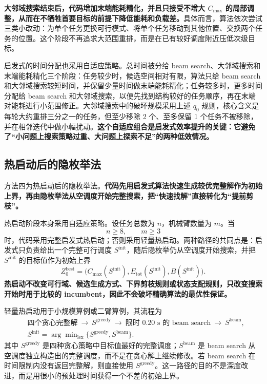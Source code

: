 \textbf{大邻域搜索结束后，代码增加末端能耗精化，并且只接受不增大 $C_{\max}$ 的局部调整，从而在不牺牲首要目标的前提下降低能耗和负载差。}具体而言，算法依次尝试三类小改动：为单个任务更换可行模式、将单个任务移动到其他位置、交换两个任务的位置。这个阶段不再追求大范围重排，而是在已有较好调度附近压低次级目标。

启发式的时间分配也采用自适应策略。总时间被分给 beam search、大邻域搜索和末端能耗精化三个阶段：任务较少时，候选空间相对有限，算法只给 beam search 和大邻域搜索较短时间，并保留少量时间做末端能耗精化；任务较多时，更多时间分配给 beam search 和大邻域搜索，以便先找到结构较好的任务顺序，再在末端对能耗进行小范围修正。大邻域搜索中的破坏规模采用上述 $q_0$ 规则，核心含义是每轮大约重排三分之一的任务，但至少移除 2 个、至多保留 1 个任务不被移除，并在相邻迭代中做小幅扰动。\textbf{这个自适应组合是启发式效率提升的关键：它避免了“小问题上搜索策略过重、大问题上探索不足”的两种低效情况。}

\subsection{热启动后的隐枚举法}

方法四为热启动后的隐枚举法。\textbf{代码先用启发式算法快速生成较优完整解作为初始上界，再由隐枚举法从空调度开始完整搜索，把“快速找解”直接转化为“提前剪枝”。}

热启动阶段本身采用自适应策略。设任务总数为 $n$，机械臂数量为 $m$。当
\[
    n\ge 8,\qquad m\ge 3
\]
时，代码采用完整启发式热启动；否则采用轻量热启动。两种路径的共同点是：启发式只负责给出一个完整可行调度 $S^{\mathrm{init}}$，随后隐枚举仍从空调度开始搜索，并把 $S^{\mathrm{init}}$ 的目标值作为初始上界
\[
    Z^{\mathrm{best}}_0
    =
    \bigl(C_{\max}(S^{\mathrm{init}}),
    E_{\mathrm{tot}}(S^{\mathrm{init}}),
    B(S^{\mathrm{init}})\bigr).
\]
\textbf{热启动不改变可行域、候选生成方式、下界剪枝规则或状态支配规则，只改变搜索开始时用于比较的 incumbent，因此不会破坏精确算法的最优性保证。}

轻量热启动用于小规模算例或二臂算例，其流程为
\[
\begin{aligned}
    &\text{四个贪心完整解}
    \ \longrightarrow\
    S^{\mathrm{greedy}}
    \ \longrightarrow\
    \text{限时 }0.20\text{ s 的 beam search}
    \ \longrightarrow\
    S^{\mathrm{beam}},\\
    &S^{\mathrm{init}}
    =
    \arg\min\nolimits_{\mathrm{lex}}
    \{S^{\mathrm{greedy}},S^{\mathrm{beam}}\}.
\end{aligned}
\]
其中 $S^{\mathrm{greedy}}$ 是四种贪心策略中目标值最好的完整调度；$S^{\mathrm{beam}}$ 是 beam search 从空调度独立构造出的完整调度，而不是在贪心解上继续修改。若 beam search 在时间限制内没有返回完整解，则直接使用 $S^{\mathrm{greedy}}$。这一路径的目的不是深度改进，而是用很小的预处理时间获得一个不差的初始上界。

